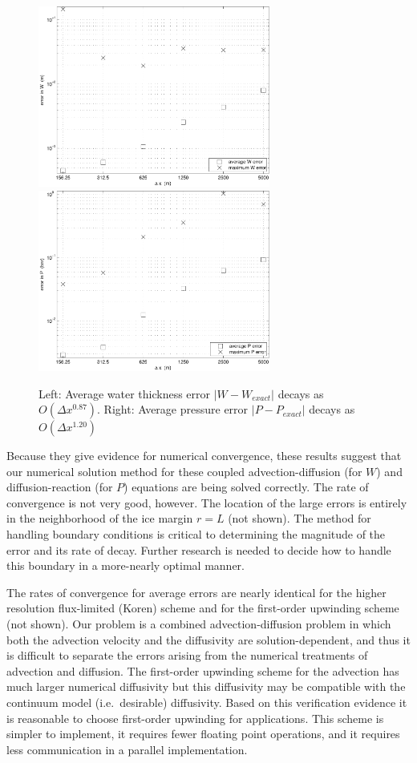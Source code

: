 \documentclass[11pt,final]{amsart}
\begin{document}
\begin{figure}[ht]
\includegraphics[width=3.0in,keepaspectratio=true]{refineWpism} \quad \includegraphics[width=3.0in,keepaspectratio=true]{refinePpism}
\caption{Left: Average water thickness error $|W-W_{exact}|$ decays as $O(\Delta x^{0.87})$.  Right: Average pressure error $|P-P_{exact}|$ decays as $O(\Delta x^{1.20})$}
\label{fig:refineWPpism}
\end{figure}

Because they give evidence for numerical convergence, these results suggest that our numerical solution method for these coupled advection-diffusion (for $W$) and diffusion-reaction (for $P$) equations are being solved correctly.  The rate of convergence is not very good, however.  The location of the large errors is entirely in the neighborhood of the ice margin $r=L$ (not shown).  The method for handling boundary conditions is critical to determining the magnitude of the error and its rate of decay.  Further research is needed to decide how to handle this boundary in a more-nearly optimal manner.

The rates of convergence for average errors are nearly identical for the higher resolution flux-limited (Koren) scheme and for the first-order upwinding scheme (not shown).  Our problem is a combined advection-diffusion problem in which both the advection velocity and the diffusivity are solution-dependent, and thus it is difficult to separate the errors arising from the numerical treatments of advection and diffusion.  The first-order upwinding scheme for the advection has much larger numerical diffusivity but this diffusivity may be compatible with the continuum model (i.e.~desirable) diffusivity.  Based on this verification evidence it is reasonable to choose first-order upwinding for applications.  This scheme is simpler to implement, it requires fewer floating point operations, and it requires less communication in a parallel implementation.
\end{document}

